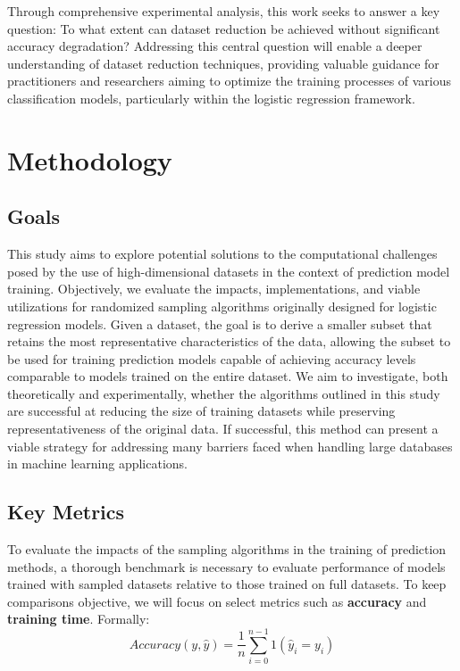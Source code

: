 \documentclass{article}
\theoremstyle{plain}
\theoremstyle{definition}
\theoremstyle{remark}
\begin{document}
Through comprehensive experimental analysis, this work seeks to answer a key question: To what extent can dataset reduction be achieved without significant accuracy degradation? Addressing this central question will enable a deeper understanding of dataset reduction techniques, providing valuable guidance for practitioners and researchers aiming to optimize the training processes of various classification models, particularly within the logistic regression framework.


\section{Methodology}

\subsection{Goals}

This study aims to explore potential solutions to the computational challenges posed by the use of high-dimensional datasets in the context of prediction model training. Objectively, we evaluate the impacts, implementations, and viable utilizations for randomized sampling algorithms originally designed for logistic regression models. Given a dataset, the goal is to derive a smaller subset that retains the most representative characteristics of the data, allowing the subset to be used for training prediction models capable of achieving accuracy levels comparable to models trained on the entire dataset. We aim to investigate, both theoretically and experimentally, whether the algorithms outlined in this study are successful at reducing the size of training datasets while preserving representativeness of the original data. If successful, this method can present a viable strategy for addressing many barriers faced when handling large databases in machine learning applications.


\subsection{Key Metrics}

To evaluate the impacts of the sampling algorithms in the training of prediction methods, a thorough benchmark is necessary to evaluate performance of models trained with sampled datasets relative to those trained on full datasets. To keep comparisons objective, we will focus on select metrics such as \textbf{accuracy} and \textbf{training time}. Formally:
$$
Accuracy(y, \hat{y}) = \frac{1}{n} \sum_{i=0}^{n-1} 1(\hat{y}_i = y_i)
$$
\end{document}

